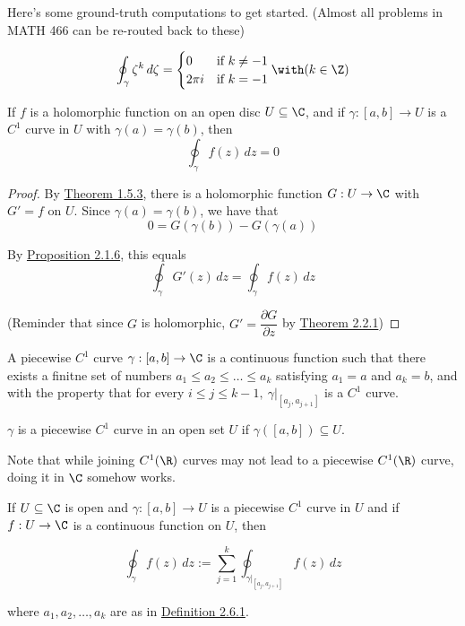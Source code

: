 Here's some ground-truth computations to get started. (Almost all problems in
MATH 466 can be re-routed back to these)

$$
  \oint_\gamma\zeta^k\,d\zeta=\begin{cases}
    0      & \text{if }k\neq-1 \\
    2\pi i & \text{if }k=-1
  \end{cases}\with(k\in\Z)
$$

\label{fb87a78}

If $f$ is a holomorphic function on an open disc $U\subseteq\C$, and if
$\gamma:[a,b]\to U$ is a $C^1$ curve in $U$ with $\gamma(a)=\gamma(b)$, then
$$\oint_\gamma f(z)\,dz=0$$

\begin{proof}
  By \href{e7808d1}{Theorem 1.5.3}, there is a holomorphic function
  $G:U\to\C$ with $G'=f$ on $U$. Since $\gamma(a)=\gamma(b)$, we have
  that
  $$
    0=G(\gamma(b))-G(\gamma(a))
  $$

  By \href{c526c09}{Proposition 2.1.6}, this equals
  $$\oint_\gamma G'(z)\,dz=\oint_\gamma f(z)\,dz$$

  (Reminder that since $G$ is holomorphic, $G'=\dfrac{\partial
    G}{\partial z}$ by \href{f75e43c}{Theorem 2.2.1})
\end{proof}

\label{baf22ac}

A piecewise $C^1$ curve $\gamma:[a,b]\to\C$ is a continuous function such that
there exists a finitne set of numbers $a_1\leq a_2\leq\ldots\leq a_k$
satisfying $a_1=a$ and $a_k=b$, and with the property that for every $i\leq
j\leq k-1,\ \gamma|_{[a_j,a_{j+1}]}$ is a $C^1$ curve.

$\gamma$ is a piecewise $C^1$ curve in an open set $U$ if
$\gamma([a,b])\subseteq U$.

Note that while joining $C^1(\R)$ curves may not lead to a piecewise $C^1(\R)$
curve, doing it in $\C$ somehow works.

\label{a99ad34}

If $U\subseteq\C$ is open and $\gamma:[a,b]\to U$ is a piecewise $C^1$ curve in
$U$ and if $f:U\to\C$ is a continuous function on $U$, then

$$
  \oint_\gamma f(z)\,dz:=\sum_{j=1}^k\oint_{\gamma|_{[a_j,a_{j+1}]}}
  f(z)\,dz
$$

where $a_1,a_2,\ldots,a_k$ are as in \href{baf22ac}{Definition 2.6.1}.

